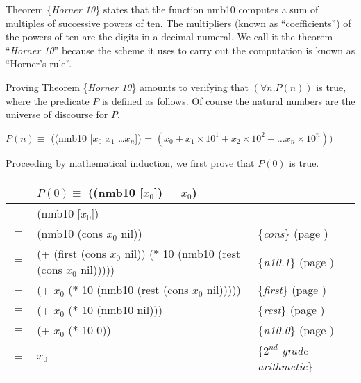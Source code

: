 Theorem \{\emph{Horner 10}\} states that the function nmb10
computes a sum of multiples of successive powers of ten.
The multipliers (known as ``coefficients'') of the powers
of ten are the digits in a decimal numeral.
We call it the theorem ``\emph{Horner 10}'' because
the scheme it uses to carry out the computation is
known as ``Horner's rule''.

Proving Theorem \{\emph{Horner 10}\} amounts to
verifying that $(\forall n.P(n))$ is true,
where the predicate $P$ is defined as follows.
Of course the natural numbers are the universe of discourse for $P$.
\begin{center}
$P(n) \equiv$
((nmb10 [$x_0$ $x_1$ \dots $x_{n}$]) =
$(x_0 + x_1 \times 10^1 + x_2 \times 10^2 + \dots x_{n} \times 10^{n}))$
\end{center}

Proceeding by mathematical induction,
we first prove that $P(0)$ is true.
\begin{center}
\begin{tabular}{lll}
    & $P(0) \equiv$ ((nmb10 [$x_0$]) = $x_0$) & \\
\hline
    & (nmb10 [$x_0$])           & \\
$=$ & (nmb10 (cons $x_0$ nil))  & \{\emph{cons}\} (page \pageref{first-rest-cons}) \\
$=$ & (+ (first (cons $x_0$ nil)) ($*$ 10 (nmb10 (rest (cons $x_0$ nil)))))  & \{\emph{n10.1}\} (page \pageref{nmb10-defun}) \\
$=$ & (+ $x_0$ ($*$ 10 (nmb10 (rest (cons $x_0$ nil)))))  & \{\emph{first}\} (page \pageref{first-rest-cons}) \\
$=$ & (+ $x_0$ ($*$ 10 (nmb10 nil)))  & \{\emph{rest}\} (page \pageref{first-rest-cons}) \\
$=$ & (+ $x_0$ ($*$ 10 0))  & \{\emph{n10.0}\} (page \pageref{nmb10-defun}) \\
$=$ & $x_0$  & \{\emph{$2^{nd}$-grade arithmetic}\} \\
\end{tabular}
\end{center}

